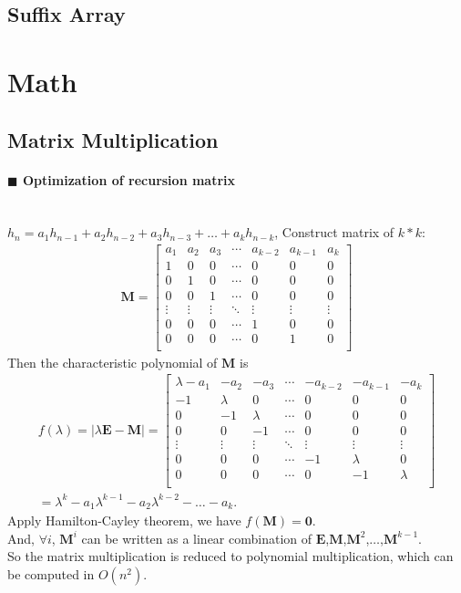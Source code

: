 \documentclass[10pt]{article}
\begin{document}
\subsection{Suffix Array}

\section{Math}
\subsection{Matrix Multiplication}

\paragraph{$\blacksquare$ Optimization of recursion matrix}
\noindent \\
$h_n=a_1h_{n-1}+a_2h_{n-2}+a_3h_{n-3}+ \ldots + a_kh_{n-k}$, Construct matrix of $k*k$:
\begin{gather*}
\mathbf{M} =
\begin{bmatrix}
a_1 & a_2 & a_3 & \cdots & a_{k-2} & a_{k-1} & a_k \\
1 & 0 & 0 & \cdots & 0 & 0 & 0 \\
0 & 1 & 0 & \cdots & 0 & 0 & 0 \\
0 & 0 & 1 & \cdots & 0 & 0 & 0 \\
\vdots & \vdots & \vdots & \ddots & \vdots & \vdots & \vdots \\
0 & 0 & 0 & \cdots & 1 & 0 & 0 \\
0 & 0 & 0 & \cdots & 0 & 1 & 0 \\
\end{bmatrix}
\end{gather*}
Then the characteristic polynomial of $\mathbf{M}$ is
\begin{gather*}
f(\lambda)=|\lambda \mathbf{E} - \mathbf{M}| =
\begin{bmatrix}
\lambda - a_1 & -a_2 & -a_3 & \cdots & -a_{k-2} & -a_{k-1} & -a_k \\
-1 & \lambda & 0 & \cdots & 0 & 0 & 0 \\
0 & -1 & \lambda & \cdots & 0 & 0 & 0 \\
0 & 0 & -1 & \cdots & 0 & 0 & 0 \\
\vdots & \vdots & \vdots & \ddots & \vdots & \vdots & \vdots \\
0 & 0 & 0 & \cdots & -1 & \lambda & 0 \\
0 & 0 & 0 & \cdots & 0 & -1 & \lambda \\
\end{bmatrix}
\\
=\lambda ^k - a_1 \lambda ^ {k-1} - a_2 \lambda ^ {k-2} - \ldots - a_k.
\end{gather*}
Apply Hamilton-Cayley theorem, we have $f(\mathbf{M})=\mathbf{0}$. \\
And, $\forall i$, $\mathbf{M} ^ i$ can be written as a linear combination of $\mathbf{E}$,$\mathbf{M}$,$\mathbf{M} ^2$,$\ldots$,$\mathbf{M} ^ {k-1}$.\\
So the matrix multiplication is reduced to polynomial multiplication, which can be computed in $O(n^2)$. \\

\end{document}
